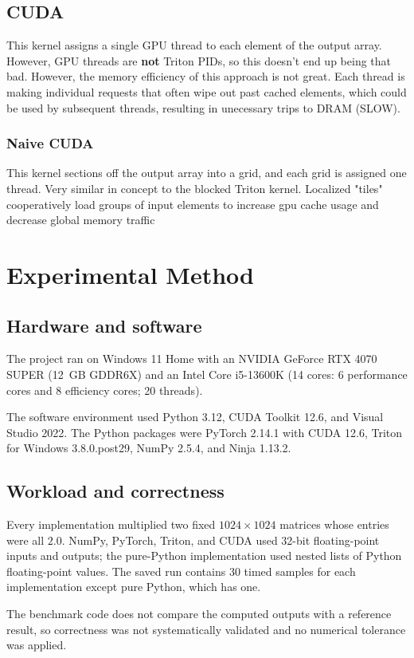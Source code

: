 \documentclass[11pt,letterpaper]{article}
\begin{document}
\subsection{CUDA}
This kernel assigns a single GPU thread to each element of the output array. However, GPU threads are \textbf{not} Triton PIDs, so this doesn't end up being that bad. However, the memory efficiency of this approach is not great. Each thread is making individual requests that often wipe out past cached elements, which could be used by subsequent threads, resulting in unecessary trips to DRAM (SLOW).

\subsubsection{Naive CUDA}
This kernel sections off the output array into a grid, and each grid is assigned one thread. Very similar in concept to the blocked Triton kernel. Localized "tiles" cooperatively load groups of input elements to increase gpu cache usage and decrease global memory traffic


\section{Experimental Method}
\subsection{Hardware and software}
The project ran on Windows 11 Home with an NVIDIA GeForce RTX 4070 SUPER (12~GB GDDR6X) and an Intel Core i5-13600K (14 cores: 6 performance cores and 8 efficiency cores; 20 threads).

The software environment used Python 3.12, CUDA Toolkit 12.6, and Visual Studio 2022. The Python packages were PyTorch 2.14.1 with CUDA 12.6, Triton for Windows 3.8.0.post29, NumPy 2.5.4, and Ninja 1.13.2.

\subsection{Workload and correctness}
Every implementation multiplied two fixed $1024 \times 1024$ matrices whose entries were all $2.0$. NumPy, PyTorch, Triton, and CUDA used 32-bit floating-point inputs and outputs; the pure-Python implementation used nested lists of Python floating-point values. The saved run contains 30 timed samples for each implementation except pure Python, which has one.

The benchmark code does not compare the computed outputs with a reference result, so correctness was not systematically validated and no numerical tolerance was applied.
\end{document}
